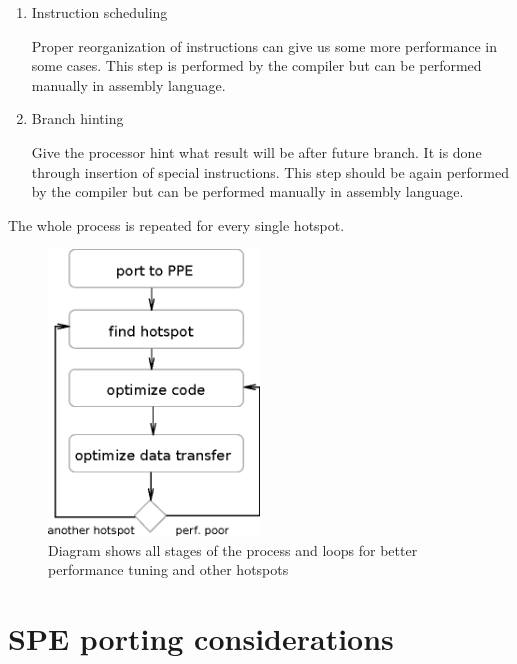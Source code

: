 \begin{enumerate}
\item{Instruction scheduling}
\par
Proper reorganization of instructions can give us some more performance in some cases.
This step is performed by the compiler but can be performed manually in assembly language.

\item{Branch hinting}
\par
Give the processor hint what result will be after future branch.
It is done through insertion of special instructions.
This step should be again performed by the compiler but can be performed manually in assembly language.
\end{enumerate}

\par
The whole process is repeated for every single hotspot.

\begin{figure}
    \centering
    \includegraphics[width=0.5\textwidth]{data/portingCycle}
    \caption[Application for Cell B.E. porting process]{Diagram shows all stages of the process and loops for better performance tuning and other hotspots}
    \label{fg:appPorting}
\end{figure}

\section {SPE porting considerations}

